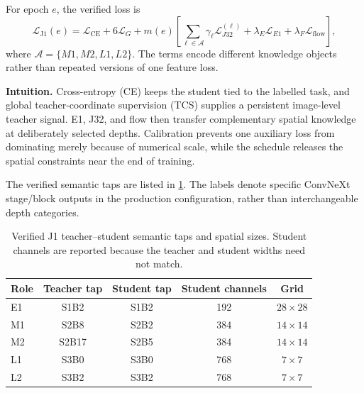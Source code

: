 For epoch $e$, the verified loss is
\begin{equation}
\mathcal{L}_{\mathrm{J1}}(e)
=\mathcal{L}_{\mathrm{CE}}+6\mathcal{L}_{G}
+m(e)\left[
\sum_{\ell\in\mathcal{A}}\gamma_\ell
\mathcal{L}_{J32}^{(\ell)}
+\lambda_E\mathcal{L}_{E1}
+\lambda_F\mathcal{L}_{\mathrm{flow}}
\right],
\label{eq:j1-total}
\end{equation}
where $\mathcal{A}=\{M1,M2,L1,L2\}$. The terms encode different knowledge
objects rather than repeated versions of one feature loss.

\begin{center}
\end{center}

\textbf{Intuition.} Cross-entropy (CE) keeps the student tied to the labelled
task, and global teacher-coordinate supervision (TCS) supplies a persistent
image-level teacher signal. E1, J32, and flow then transfer complementary
spatial knowledge at deliberately selected depths. Calibration prevents one
auxiliary loss from dominating merely because of numerical scale, while the
schedule releases the spatial constraints near the end of training.

The verified semantic taps are listed in \cref{tab:j1-taps}. The labels denote
specific ConvNeXt stage/block outputs in the production configuration, rather
than interchangeable depth categories.

\begin{table}[H]
\centering
\caption{Verified J1 teacher--student semantic taps and spatial sizes. Student
channels are reported because the teacher and student widths need not match.}
\label{tab:j1-taps}
\small
\begin{tabular}{lcccc}
\toprule
Role & Teacher tap & Student tap & Student channels & Grid\\
\midrule
E1 & S1B2  & S1B2 & 192 & $28\times28$\\
M1 & S2B8  & S2B2 & 384 & $14\times14$\\
M2 & S2B17 & S2B5 & 384 & $14\times14$\\
L1 & S3B0  & S3B0 & 768 & $7\times7$\\
L2 & S3B2  & S3B2 & 768 & $7\times7$\\
\bottomrule
\end{tabular}
\end{table}

